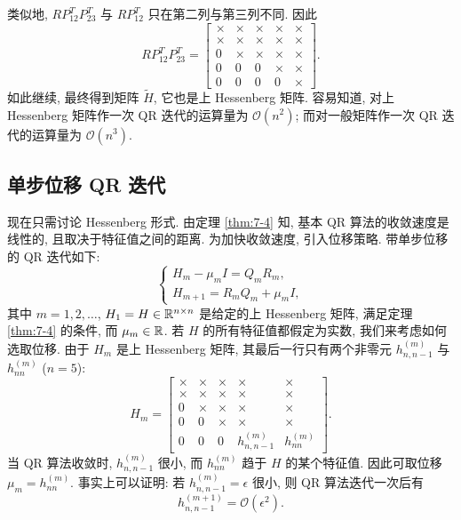 类似地, $RP_{12}^TP_{23}^T$ 与 $RP_{12}^T$ 只在第二列与第三列不同. 因此
\[
  RP_{12}^TP_{23}^T=\begin{bmatrix}
    \times & \times & \times & \times & \times\\
    \times & \times & \times & \times & \times\\
    0 & \times & \times & \times & \times\\
    0 & 0 & 0 & \times & \times\\
    0 & 0 & 0 & 0 & \times
  \end{bmatrix}.
\]
如此继续, 最终得到矩阵 $\widetilde{H}$, 它也是上 Hessenberg 矩阵. 容易知道, 对上 Hessenberg 矩阵作一次 QR 迭代的运算量为 $\mathcal{O}(n^2)$; 而对一般矩阵作一次 QR 迭代的运算量为 $\mathcal{O}(n^3)$.

\subsection{单步位移 QR 迭代}
\label{sec:7-5-2}

现在只需讨论 Hessenberg 形式. 由定理 \ref{thm:7-4} 知, 基本 QR 算法的收敛速度是线性的, 且取决于特征值之间的距离. 为加快收敛速度, 引入位移策略. 带单步位移的 QR 迭代如下:
\begin{equation}
  \left\{
  \begin{array}{l}
    H_m-\mu_mI=Q_mR_m,\\
    H_{m+1}=R_mQ_m+\mu_mI,
  \end{array}
  \right.
  \label{eq:7-26}
\end{equation}
其中 $m=1,2,\ldots$, $H_1=H\in\mathbb{R}^{n\times n}$ 是给定的上 Hessenberg 矩阵, 满足定理 \ref{thm:7-4} 的条件, 而 $\mu_m\in\mathbb{R}$. 若 $H$ 的所有特征值都假定为实数, 我们来考虑如何选取位移. 由于 $H_m$ 是上 Hessenberg 矩阵, 其最后一行只有两个非零元 $h_{n,n-1}^{(m)}$ 与 $h_{nn}^{(m)}$ ($n=5$):
\[
  H_m=\begin{bmatrix}
    \times & \times & \times & \times & \times\\
    \times & \times & \times & \times & \times\\
    0 & \times & \times & \times & \times\\
    0 & 0 & \times & \times & \times\\
    0 & 0 & 0 & h_{n,n-1}^{(m)} & h_{nn}^{(m)}
  \end{bmatrix}.
\]
当 QR 算法收敛时, $h_{n,n-1}^{(m)}$ 很小, 而 $h_{nn}^{(m)}$ 趋于 $H$ 的某个特征值. 因此可取位移 $\mu_m=h_{nn}^{(m)}$. 事实上可以证明: 若 $h_{n,n-1}^{(m)}=\epsilon$ 很小, 则 QR 算法迭代一次后有
\begin{equation}
  h_{n,n-1}^{(m+1)}=\mathcal{O}(\epsilon^2).
  \label{eq:7-27}
\end{equation}

